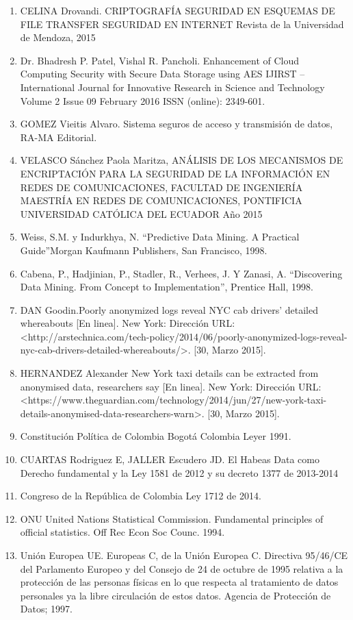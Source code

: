 \documentclass[a4paper,openright,12pt]{book}
\theoremstyle{definition}
\theoremstyle{remark}
\begin{document}
\begin{enumerate}
    \item CELINA Drovandi. CRIPTOGRAFÍA
SEGURIDAD EN ESQUEMAS DE FILE TRANSFER SEGURIDAD EN INTERNET Revista de la Universidad de Mendoza, 2015
    \item Dr. Bhadresh P. Patel, Vishal R. Pancholi. Enhancement of Cloud Computing Security with Secure Data Storage using AES IJIRST –International Journal for Innovative Research in Science and Technology Volume 2 Issue 09 February 2016 ISSN (online): 2349-601.
    \item GOMEZ Vieitis Alvaro. Sistema seguros de acceso y transmisión de datos, RA-MA Editorial.
    \item VELASCO Sánchez Paola Maritza, ANÁLISIS DE LOS MECANISMOS DE ENCRIPTACIÓN PARA LA SEGURIDAD DE LA INFORMACIÓN EN REDES DE COMUNICACIONES, FACULTAD DE INGENIERÍA MAESTRÍA EN REDES DE COMUNICACIONES, PONTIFICIA UNIVERSIDAD CATÓLICA DEL ECUADOR Año 2015
    \item Weiss, S.M. y Indurkhya, N. “Predictive Data Mining. A Practical Guide”Morgan Kaufmann Publishers, San Francisco, 1998.
    \item Cabena, P., Hadjinian, P., Stadler, R., Verhees, J. Y Zanasi, A. “Discovering Data Mining. From Concept to Implementation”, Prentice Hall, 1998.
    \item DAN Goodin.Poorly anonymized logs reveal NYC cab drivers’ detailed whereabouts [En linea]. New York: Dirección URL: <http://arstechnica.com/tech-policy/2014/06/poorly-anonymized-logs-reveal-nyc-cab-drivers-detailed-whereabouts/>. [30, Marzo 2015].
    \item HERNANDEZ Alexander New York taxi details can be extracted from anonymised data, researchers say [En linea]. New York: Dirección URL: <https://www.theguardian.com/technology/2014/jun/27/new-york-taxi-details-anonymised-data-researchers-warn>. [30, Marzo 2015].
    \item Constitución Política de Colombia Bogotá Colombia Leyer 1991.
    \item CUARTAS Rodriguez E, JALLER Escudero JD. El Habeas Data como Derecho fundamental y la Ley 1581 de 2012 y su decreto 1377 de 2013-2014
    \item Congreso de la República de Colombia Ley 1712 de 2014.
    \item ONU United Nations Statistical Commission. Fundamental principles of official statistics. Off Rec Econ Soc Counc. 1994.
    \item Unión Europea UE. Europeas C, de la Unión Europea C. Directiva 95/46/CE del Parlamento Europeo y del Consejo de 24 de octubre de 1995 relativa a la protección de las personas físicas en lo que respecta al tratamiento de datos personales ya la libre circulación de estos datos. Agencia de Protección de Datos; 1997.
\end{enumerate}
\end{document}
